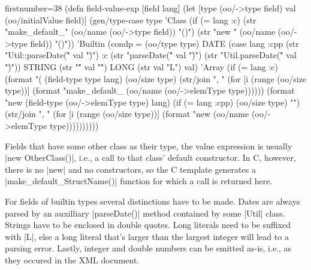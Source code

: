 \documentclass[submission]{eptcs}
\newcommand{\code}{\clojureinline}
\begin{document}
\begin{clojurecode*}{firstnumber=38}
(defn field-value-exp [field lang]
  (let [type (oo/->type field)
        val (oo/initialValue field)]
    (gen/type-case type
      'Class (if (= lang :c)
               (str "make_default_" (oo/name (oo/->type field)) "()")
               (str "new " (oo/name (oo/->type field)) "()"))
      'Builtin (condp = (oo/type type)
                 DATE   (case lang
                          :cpp (str "Util::parseDate(\"" val "\")")
                          :c   (str "parseDate(\"" val "\")")
                          (str "Util.parseDate(\"" val "\")"))
                 STRING (str "\"" val "\"")
                 LONG   (str val "L")
                 val)
      'Array (if (= lang :c)
               (format "(%
                       (field-type type lang)
                       (oo/size type)
                       (str/join ", " (for [i (range (oo/size type))]
                                        (format "make_default_%
                                                (oo/name (oo/->elemType type))))))
               (format "new %
                       (field-type (oo/->elemType type) lang)
                       (if (= lang :cpp) (oo/size type) "")
                       (str/join ", " (for [i (range (oo/size type))]
                                        (format "new %
                                                (oo/name (oo/->elemType type))))))))))
\end{clojurecode*}

Fields that have some other class as their type, the value expression is
usually \code|new OtherClass()|, i.e., a call to that class' default
constructor.  In C, however, there is no \code|new| and no constructors, so the
C template generates a \code|make_default_StructName()| function for which a
call is returned here.

For fields of builtin types several distinctions have to be made.  Dates are
always parsed by an auxilliary \code|parseDate()| method contained by some
\code|Util| class.  Strings have to be enclosed in double quotes.  Long
literals need to be suffixed with \code|L|, else a long literal that's larger
than the largest integer will lead to a parsing error.  Lastly, integer and
double numbers can be emitted as-is, i.e., as they occured in the XML document.
\end{document}
